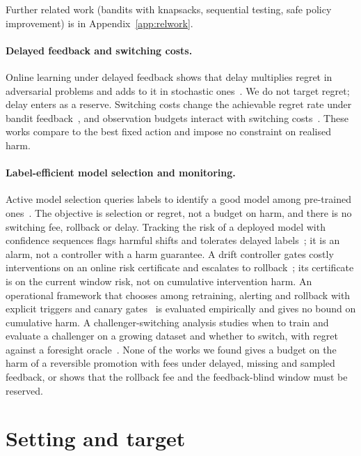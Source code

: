 \documentclass[10pt]{article}
\theoremstyle{plain}
\theoremstyle{definition}
\begin{document}
Further related work (bandits with knapsacks, sequential testing, safe policy improvement) is in Appendix~\ref{app:relwork}.

\paragraph{Delayed feedback and switching costs.}
Online learning under delayed feedback shows that delay multiplies regret in adversarial problems and adds to it in stochastic ones~\citep{joulani2013delayed}. We do not target regret; delay enters as a reserve. Switching costs change the achievable regret rate under bandit feedback~\citep{cesabianchi2013switching}, and observation budgets interact with switching costs~\citep{cheng2023feedback}. These works compare to the best fixed action and impose no constraint on realised harm.

\paragraph{Label-efficient model selection and monitoring.}
Active model selection queries labels to identify a good model among pre-trained ones~\citep{karimi2021online,liu2024cams}. The objective is selection or regret, not a budget on harm, and there is no switching fee, rollback or delay. Tracking the risk of a deployed model with confidence sequences flags harmful shifts and tolerates delayed labels~\citep{podkopaev2022tracking}; it is an alarm, not a controller with a harm guarantee. A drift controller gates costly interventions on an online risk certificate and escalates to rollback~\citep{lamaakal2026drift2act}; its certificate is on the current window risk, not on cumulative intervention harm. An operational framework that chooses among retraining, alerting and rollback with explicit triggers and canary gates~\citep{sadeghian2026rar} is evaluated empirically and gives no bound on cumulative harm. A challenger-switching analysis studies when to train and evaluate a challenger on a growing dataset and whether to switch, with regret against a foresight oracle~\citep{digalakis2025challenger}. None of the works we found gives a budget on the harm of a reversible promotion with fees under delayed, missing and sampled feedback, or shows that the rollback fee and the feedback-blind window must be reserved.

\section{Setting and target}\label{sec:setting}
\end{document}
